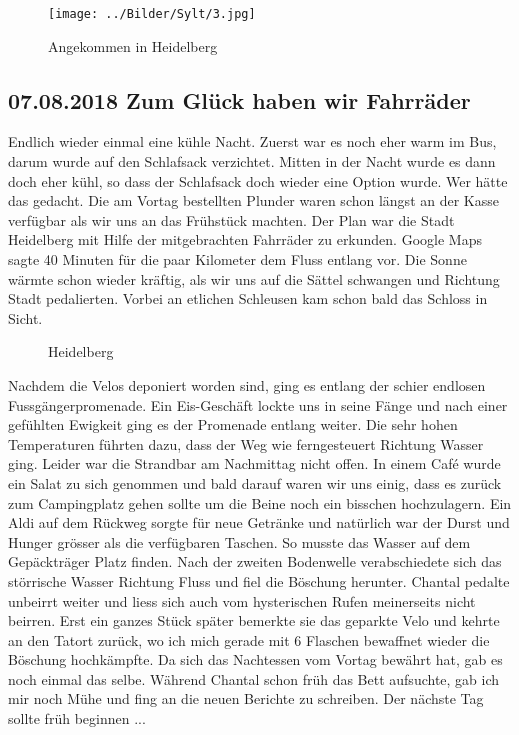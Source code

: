 \begin{figure}[hb]
    \centering
    \texttt{[image: ../Bilder/Sylt/3.jpg]}
    \caption{Angekommen in Heidelberg}
    \label{img:Sardinien}
\end{figure}

\subsection{07.08.2018 Zum Glück haben wir Fahrräder}
Endlich wieder einmal eine kühle Nacht.
Zuerst war es noch eher warm im Bus, darum wurde auf den Schlafsack verzichtet.
Mitten in der Nacht wurde es dann doch eher kühl, so dass der Schlafsack doch wieder eine Option wurde.
Wer hätte das gedacht.
Die am Vortag bestellten Plunder waren schon längst an der Kasse verfügbar als wir uns an das Frühstück machten.
Der Plan war die Stadt Heidelberg mit Hilfe der mitgebrachten Fahrräder zu erkunden. 
Google Maps sagte 40 Minuten für die paar Kilometer dem Fluss entlang vor.
Die Sonne wärmte schon wieder kräftig, als wir uns auf die Sättel schwangen und Richtung Stadt pedalierten.
Vorbei an etlichen Schleusen kam schon bald das Schloss in Sicht. 

\begin{figure}[H]
   \centering
   \quad
   \quad
   \quad
   \caption[Heidelberg]{Heidelberg}
\end{figure}

Nachdem die Velos deponiert worden sind, ging es entlang der schier endlosen Fussgängerpromenade.
Ein Eis-Geschäft lockte uns in seine Fänge und nach einer gefühlten Ewigkeit ging es der Promenade entlang weiter.
Die sehr hohen Temperaturen führten dazu, dass der Weg wie ferngesteuert Richtung Wasser ging. 
Leider war die Strandbar am Nachmittag nicht offen. 
In einem Café wurde ein Salat zu sich genommen und bald darauf waren wir uns einig, dass es zurück zum Campingplatz gehen sollte um die Beine noch ein bisschen hochzulagern.
Ein Aldi auf dem Rückweg sorgte für neue Getränke und natürlich war der Durst und Hunger grösser als die verfügbaren Taschen.
So musste das Wasser auf dem Gepäckträger Platz finden. 
Nach der zweiten Bodenwelle verabschiedete sich das störrische Wasser Richtung Fluss und fiel die Böschung herunter.
Chantal pedalte unbeirrt weiter und liess sich auch vom hysterischen Rufen meinerseits nicht beirren.
Erst ein ganzes Stück später bemerkte sie das geparkte Velo und kehrte an den Tatort zurück, wo ich mich gerade mit 6 Flaschen bewaffnet wieder die Böschung hochkämpfte.
Da sich das Nachtessen vom Vortag bewährt hat, gab es noch einmal das selbe.
Während Chantal schon früh das Bett aufsuchte, gab ich mir noch Mühe und fing an die neuen Berichte zu schreiben.
Der nächste Tag sollte früh beginnen ... 

